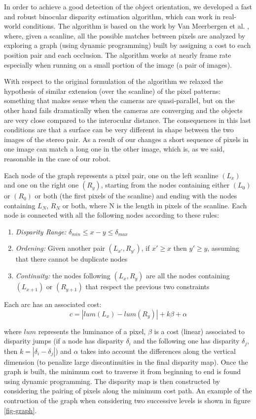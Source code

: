 In order to achieve a good detection of the object orientation, we developed a fast and robust binocular disparity estimation algorithm, which can work in real-world conditions.
The algorithm is based on the work by Van Meerbergen et al. \cite{merrbergen02stereo}, where, given a scanline, all the possible matches between pixels are analyzed by exploring a graph (using dynamic programming) built by assigning a cost to each position pair and each occlusion. The algorithm works at nearly frame rate especially when running on a small portion of the image (a pair of images). 

With respect to the original formulation of the algorithm we relaxed the hypothesis of similar extension (over the scanline) of the pixel patterns: something that makes sense when the cameras are quasi-parallel, but on the other hand fails dramatically when the cameras are converging and the objects are very close compared to the interocular distance.
The consequences in this last conditions are that a surface can be very different in shape between the two images of the stereo pair. As a result of our changes a short sequence of pixels in one image can match a long one in the other image, which is, as we said, reasonable in the case of our robot.

Each node of the graph represents a pixel pair, one on the left scanline $(L_x)$ and one on the right one $(R_y)$, starting from the nodes containing either $(L_0)$ or $(R_0)$ or both (the first pixels of the scanline) and ending with the nodes containing ${L_N}$, ${R_N}$ or both, where N is the length in pixels of the scanline. Each node is connected with all the following nodes according to these rules:

\begin{enumerate}
	\item \textit{Disparity Range:} $\delta_{min}\leq x-y \leq \delta_{max}$
	\item \textit{Ordening:} Given another pair $(L_{x'},R_{y'})$, if $x'\geq x$ then $y'\geq y$, assuming that there cannot be duplicate nodes
	\item \textit{Continuity:} the nodes following $(L_x,R_y)$ are all the nodes containing $(L_{x+1})$ or $(R_{y+1})$ that respect the previous two constraints
\end{enumerate}

Each arc has an associated cost:
	\[c=\left|lum(L_x)-lum(R_y)\right|+k\beta+\alpha
\]

\noindent where $lum$ represents the luminance of a pixel, $\beta$ is a cost (linear) associated to disparity jumps (if a node has disparity $\delta_i$ and the following one has disparity $\delta_j$, then $k=|\delta_i-\delta_j|$) and $\alpha$ takes into account the differences along the vertical dimension (to penalize large discontinuities in the final disparity map). Once the graph is built, the minimum cost to traverse it from beginning to end is found using dynamic programming. The disparity map is then constructed by considering the pairing of pixels along the minimum cost path. An example of the contruction of the graph when considering two successive levels is shown in figure \ref{fig-graph}.

